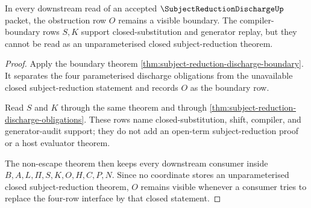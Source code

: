 \begin{theorem}
\label{thm:subject-reduction-discharge-obstruction-preservation}
In every downstream read of an accepted $\SubjectReductionDischargeUp$ packet, the obstruction row $O$ remains a visible boundary. The compiler-boundary rows $S,K$ support closed-substitution and generator replay, but they cannot be read as an unparameterised closed subject-reduction theorem.
\end{theorem}
\begin{proof}
Apply the boundary theorem \autoref{thm:subject-reduction-discharge-boundary}. It separates the four parameterised discharge obligations from the unavailable closed subject-reduction statement and records $O$ as the boundary row.

Read $S$ and $K$ through the same theorem and through \autoref{thm:subject-reduction-discharge-obligations}. These rows name closed-substitution, shift, compiler, and generator-audit support; they do not add an open-term subject-reduction proof or a host evaluator theorem.

The non-escape theorem then keeps every downstream consumer inside $B,A,L,\Pi,S,K,O,H,C,P,N$. Since no coordinate stores an unparameterised closed subject-reduction theorem, $O$ remains visible whenever a consumer tries to replace the four-row interface by that closed statement.
\end{proof}

